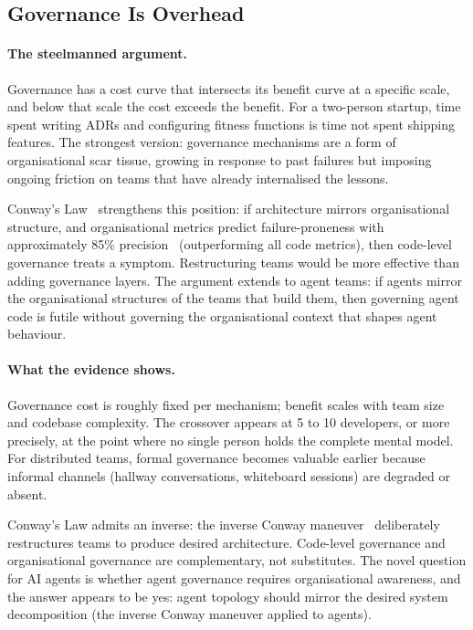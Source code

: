 \documentclass[11pt, a4paper]{googledeepmind}
\begin{document}
\subsection{Governance Is Overhead}
\label{sec:contrarian-overhead}

\paragraph{The steelmanned argument.}
Governance has a cost curve that intersects its benefit curve at a specific
scale, and below that scale the cost exceeds the benefit.  For a two-person
startup, time spent writing ADRs and configuring fitness functions is time not
spent shipping features.  The strongest version: governance mechanisms are a
form of organisational scar tissue, growing in response to past failures but
imposing ongoing friction on teams that have already internalised the lessons.

Conway's Law~\citep{conway1968} strengthens this position: if architecture
mirrors organisational structure, and organisational metrics predict
failure-proneness with approximately 85\% precision~\citep{nagappan2008}
(outperforming all code metrics), then code-level governance treats a symptom.
Restructuring teams would be more effective than adding governance layers.  The
argument extends to agent teams: if agents mirror the organisational structures
of the teams that build them, then governing agent code is futile without
governing the organisational context that shapes agent behaviour.

\paragraph{What the evidence shows.}
Governance cost is roughly fixed per mechanism; benefit scales with team size
and codebase complexity.  The crossover appears at 5 to 10 developers, or more
precisely, at the point where no single person holds the complete mental model.
For distributed teams, formal governance becomes valuable earlier because
informal channels (hallway conversations, whiteboard sessions) are degraded or
absent.

Conway's Law admits an inverse: the inverse Conway
maneuver~\citep{skelton2019} deliberately restructures teams to produce desired
architecture.  Code-level governance and organisational governance are
complementary, not substitutes.  The novel question for AI agents is whether
agent governance requires organisational awareness, and the answer appears to be
yes: agent topology should mirror the desired system decomposition (the inverse
Conway maneuver applied to agents).
\end{document}
